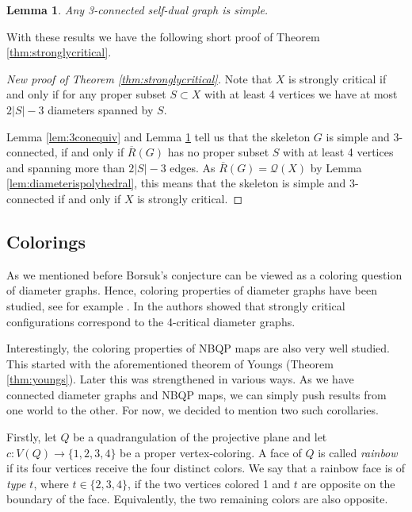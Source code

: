 \documentclass{article}
\newtheorem{lemma}[theorem]{Lemma}
\newcounter{example}
\newcommand{\qt}{\mathcal{Q}}
\begin{document}
\begin{lemma}\label{lem:selfdualsimple}
    Any 3-connected self-dual graph is simple. 
\end{lemma}

With these results we have the following short proof of Theorem \ref{thm:stronglycritical}.

\begin{proof}[New proof of Theorem \ref{thm:stronglycritical}]
Note that  $X$ is strongly critical if and only if for any proper subset $S\subset X$ with at least 4 vertices we have at most $2|S|-3$ diameters spanned by $S$.

Lemma \ref{lem:3conequiv} and Lemma \ref{lem:selfdualsimple} tell us that the skeleton $G$ is simple and 3-connected, if and only if $\overline R(G)$ has no proper subset $S$ with at least 4 vertices and spanning more than  $2|S|-3$ edges. As $\overline R(G)=\qt(X)$ by Lemma \ref{lem:diameterispolyhedral}, this means that the skeleton is simple and 3-connected if and only if $X$ is strongly critical.
    
\end{proof}



 




\subsection{Colorings}
As we mentioned before Borsuk's conjecture can be viewed as a coloring question of diameter graphs. Hence, coloring properties of diameter graphs have been studied, see for example \cite{hujter2014multiple}. In \cite{lopez2023borsuk} the authors showed that strongly critical configurations correspond to the 4-critical diameter graphs. 

Interestingly, the coloring properties of NBQP maps are also very well studied. This started with the aforementioned theorem of Youngs (Theorem \ref{thm:youngs}). Later this was strengthened in various ways. As we have connected diameter graphs and NBQP maps, we can simply push results from one world to the other. For now, we decided to mention two such corollaries.  

Firstly, let $Q$ be a quadrangulation of the projective plane and let $c:V(Q)\rightarrow\{1,2,3,4\}$ be a proper vertex-coloring. A face of $Q$ is called \emph{rainbow} if its four vertices receive the four distinct colors. We say that a rainbow face is of \emph{type $t$}, where
$t\in\{2,3,4\}$, if the two vertices colored 1 and $t$ are opposite on the boundary of the face. Equivalently, the two remaining colors are also opposite.
\end{document}
